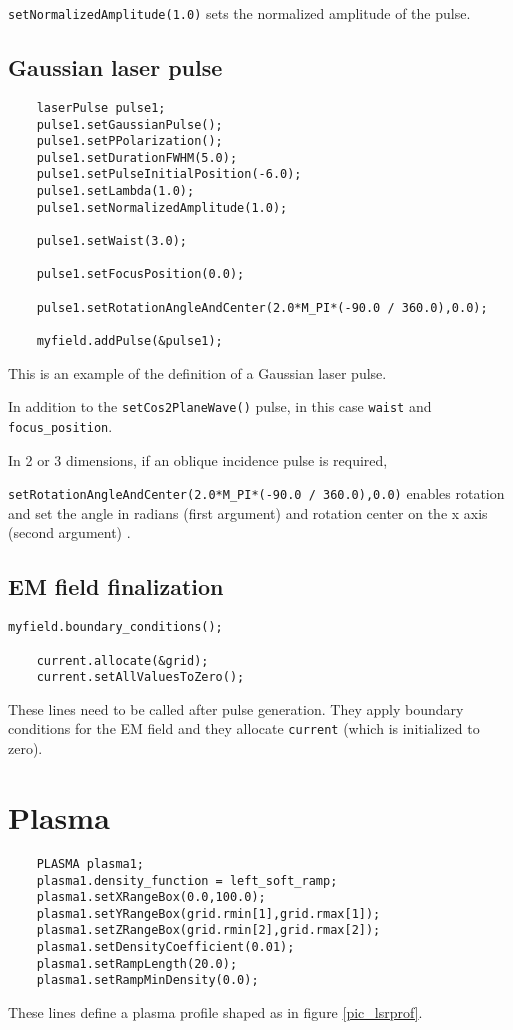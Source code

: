 \documentclass[11pt,a4paper]{report}
\begin{document}
\verb+setNormalizedAmplitude(1.0)+ sets the normalized amplitude of the pulse.


\subsection{Gaussian laser pulse}
\begin{lstlisting}
	laserPulse pulse1;
	pulse1.setGaussianPulse();
   	pulse1.setPPolarization();
   	pulse1.setDurationFWHM(5.0);
   	pulse1.setPulseInitialPosition(-6.0);
   	pulse1.setLambda(1.0);
   	pulse1.setNormalizedAmplitude(1.0);
    
	pulse1.setWaist(3.0);
	
   	pulse1.setFocusPosition(0.0);
	
	pulse1.setRotationAngleAndCenter(2.0*M_PI*(-90.0 / 360.0),0.0);

	myfield.addPulse(&pulse1);
\end{lstlisting}
This is an example of the definition of a Gaussian laser pulse.

In addition to the \verb+setCos2PlaneWave()+ pulse, in this case \verb+waist+ and \verb+focus_position+.

In 2 or 3 dimensions, if an oblique incidence pulse is required,

\verb+setRotationAngleAndCenter(2.0*M_PI*(-90.0 / 360.0),0.0)+ enables rotation and set the angle in radians (first argument) and rotation center on the x axis (second argument) .
\subsection{EM field finalization}
\begin{lstlisting}[backgroundcolor=\color{no_modify}]
	myfield.boundary_conditions();

	current.allocate(&grid);
	current.setAllValuesToZero();
\end{lstlisting}
These lines need to be called after pulse generation. They apply boundary conditions for the EM field and they allocate \verb+current+ (which is initialized to zero).

\section{Plasma}
\begin{lstlisting}
	PLASMA plasma1;
	plasma1.density_function = left_soft_ramp;      
	plasma1.setXRangeBox(0.0,100.0);    
	plasma1.setYRangeBox(grid.rmin[1],grid.rmax[1]);                 
	plasma1.setZRangeBox(grid.rmin[2],grid.rmax[2]);
	plasma1.setDensityCoefficient(0.01);
	plasma1.setRampLength(20.0);
	plasma1.setRampMinDensity(0.0);             
\end{lstlisting}
These lines define a plasma profile shaped as in figure \ref{pic_lsrprof}.
\end{document}

